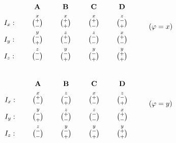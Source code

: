 \documentclass[PaulGanssle-Thesis.tex]{subfiles}
\begin{document}
\begin{equation}
\begin{aligned}
&       &\hspace*{5mm}&               &\hspace*{5mm}&               &\hspace*{5mm}&        &\hspace*{5mm}&       & \\
&       && \specialcell{\hfill{}\mathbf{A}\hfill{}}   &&     \specialcell{\hfill{}\mathbf{B}\hfill{}}             && \specialcell{\hfill{}\mathbf{C}\hfill{}}     &&        \specialcell{\hfill{}\mathbf{D}\hfill{}}         & \\
&I_{x}: && \overset{x}{\tbinom{+}{-}} && \overset{x}{\tbinom{+}{+}} && \overset{x}{\tbinom{+}{-}}  && \overset{z}{\tbinom{-}{+}}& \\
&I_{y}: && \overset{y}{\tbinom{-}{+}} && \overset{z}{\tbinom{+}{-}} && \overset{z}{\tbinom{-}{-}}  && \overset{x}{\tbinom{+}{-}}& \\
&I_{z}: && \overset{z}{\tbinom{-}{-}} && \overset{y}{\tbinom{-}{+}} && \overset{y}{\tbinom{-}{+}}  && \overset{y}{\tbinom{+}{+}}&
\end{aligned}
\label{eqn:VectorSequenceCyclePhiX}
\tag{$\varphi = x$}
\end{equation}

\begin{equation}
\begin{aligned}
&       &\hspace*{5mm}&               &\hspace*{5mm}&               &\hspace*{5mm}&        &\hspace*{5mm}&       & \\
&       && \specialcell{\hfill{}\mathbf{A}\hfill{}}   &&     \specialcell{\hfill{}\mathbf{B}\hfill{}}             && \specialcell{\hfill{}\mathbf{C}\hfill{}}     &&        \specialcell{\hfill{}\mathbf{D}\hfill{}}         & \\
&I_{x}: && \overset{x}{\tbinom{+}{-}} && \overset{z}{\tbinom{-}{+}} && \overset{x}{\tbinom{+}{-}}  && \overset{z}{\tbinom{-}{+}}& \\
&I_{y}: && \overset{y}{\tbinom{-}{+}} && \overset{z}{\tbinom{+}{-}} && \overset{z}{\tbinom{-}{-}}  && \overset{x}{\tbinom{+}{-}}& \\
&I_{z}: && \overset{z}{\tbinom{-}{-}} && \overset{y}{\tbinom{-}{+}} && \overset{y}{\tbinom{-}{+}}  && \overset{y}{\tbinom{+}{+}}&
\end{aligned}
\label{eqn:VectorSequenceCyclePhiY}
\tag{$\varphi = y$}
\end{equation}
\end{document}
